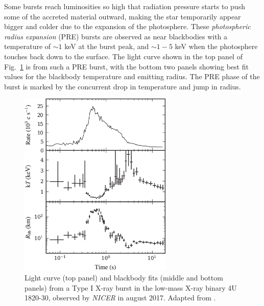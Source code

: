 \documentclass[../main.tex]{subfiles}
\begin{document}
Some bursts reach luminosities so high that radiation pressure starts to push some of the accreted material outward, making the star temporarily appear bigger and colder due to the expansion of the photosphere.  These \textit{photospheric radius expansion} (PRE) bursts are observed as near blackbodies with a temperature of ${\sim}1$ keV at the burst peak, and ${\sim}1-5$ keV when the photosphere touches back down to the surface. The light curve shown in the top panel of Fig.~\ref{fig:keek2018_fig3} is from such a PRE burst, with the bottom two panels showing best fit values for the blackbody temperature and emitting radius. The PRE phase of the burst is marked by the concurrent drop in temperature and jump in radius.  

\begin{figure}[htb!]
    \centering
    \includegraphics[width=0.65\textwidth]{figures/Keek2018_fig3_mod.png}
    \caption[Type I X-ray burst light curve]{Light curve (top panel) and blackbody fits (middle and bottom panels) from a Type I X-ray burst in the low-mass X-ray binary 4U 1820-30, observed by \textit{NICER} in august 2017. Adapted from \citet{Keek2018a}.}
    \label{fig:keek2018_fig3}
\end{figure}

\end{document}
